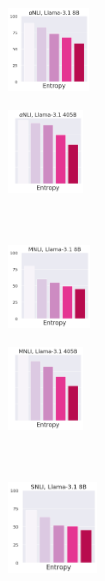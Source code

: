 \begin{figure}
    \centering
    \begin{subfigure}[b]{0.3\textwidth}
        \begin{subfigure}[b]{0.48\textwidth}
        \includegraphics[height=2.2cm, trim=10 30 0 0, clip]{figures/entropy_acc_abductivenli_8B}
        \end{subfigure}
        \begin{subfigure}[b]{0.35\textwidth}
            \includegraphics[height=2.2cm, trim=10 30 0 0, clip]{figures/entropy_acc_abductivenli_405B}
        \end{subfigure}\\
        \begin{subfigure}[b]{0.48\textwidth}
            \includegraphics[height=2.2cm, trim=10 30 0 0, clip]{figures/entropy_acc_mnli_matched_8B}
        \end{subfigure}
        \begin{subfigure}[b]{0.35\textwidth}
            \includegraphics[height=2.2cm, trim=10 30 0 0, clip]{figures/entropy_acc_mnli_matched_405B}
        \end{subfigure}\\
        \begin{subfigure}[b]{0.48\textwidth}
            \includegraphics[height=2.4cm, trim=10 0 0 0, clip]{figures/entropy_acc_snli_8B}

\end{subfigure}
\end{subfigure}
\end{figure}
